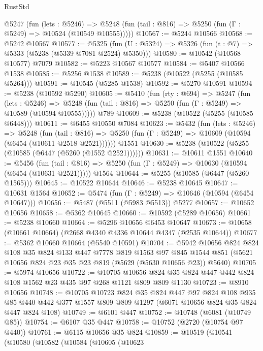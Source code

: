 \begin{lexlean}{RustStd}
\begin{coremodule}
    @5247
      (fun (lets : @5246) =>
      @5248 (fun (tail : @816) => @5250 (fun (Γ : @5249) => @10524 (@10549 @10555)))))
@10567 := @5244 @10566
@10568 := @5242 @10567
@10577 := @5325 (fun (U : @5324) => @5326 (fun (t : @7) => @5333 (@5238 (@5339 @7081 @2524) @5350)))
@10580 := @10542 (@10568 @10577) @7079
@10582 := @5223 @10567 @10577
@10584 := @5407 @10566 @1538
@10585 := @5256 @1538
@10589 := @5238 (@10522 (@5255 (@10585 @5264)))
@10591 := @10545 (@5285 @1538)
@10592 := @5270 @10591
@10594 := @5238 (@10592 @5290)
@10605 := @5410
    (fun (rty : @694) =>
    @5247
      (fun (lets : @5246) =>
      @5248 (fun (tail : @816) => @5250 (fun (Γ : @5249) => @10589 (@10594 @10555)))))
    @789
@10609 := @5238 (@10522 (@5255 (@10585 @6448)))
@10611 := @6455 @10550 @7084
@10623 := @5432
    (fun (lets : @5246) =>
    @5248
      (fun (tail : @816) =>
      @5250 (fun (Γ : @5249) => @10609 (@10594 (@6454 (@10611 @2518 @2521))))))
    @1551
@10630 := @5238 (@10522 (@5255 (@10585 (@6447 (@5260 (@1552 @2521))))))
@10631 := @10611 @1551
@10640 := @5456
    (fun (tail : @816) => @5250 (fun (Γ : @5249) => @10630 (@10594 (@6454 (@10631 @2521)))))
    @1564
@10644 := @5255 (@10585 (@6447 (@5260 @1565)))
@10645 := @10522 @10644
@10646 := @5238 @10645
@10647 := @10631 @1564
@10652 := @5474 (fun (Γ : @5249) => @10646 (@10594 (@6454 @10647)))
@10656 := @5487 (@5511 (@5983 @5513)) @5277
@10657 := @10652 @10656
@10658 := @5362 @10645
@10660 := @10592 (@5289 @10656)
@10661 := @5238 @10660
@10664 := @5296 @10656 @6453 @10647
@10673 := @10658 (@10661 @10664) (@2668 @4340 @4336 @10644 @4347 (@2535 @10644))
@10677 := @5362 @10660 @10664 (@5540 @10591)
@10704 := @5942
    @10656
    @824
    @824
    @108
    @35
    @824
    @133
    @447
    @7778
    @819
    @1563
    @97
    @845
    @1544
    @851
    (@5621 @10656 @824 @23 @35 @23 @819 (@5629 (@5630 @10656 @23)) @5640)
@10705 := @5974 @10656
@10722 := @10705
    @10656
    @824
    @35
    @824
    @447
    @442
    @824
    @108
    @1562
    @23
    @435
    @97
    @268
    @1121
    @809
    @809
    @1130
@10723 := @8910 @10656
@10748 := @10705
    @10723
    @824
    @35
    @824
    @447
    @97
    @824
    @108
    @935
    @85
    @440
    @442
    @377
    @1557
    @809
    @809
    @1297
    (@6071 @10656 @824 @35 @824 @447 @824 @108)
@10749 := @6101 @447
@10752 := @10748 (@6081 (@10749 @85))
@10754 := @6107 @35 @447
@10758 := @10752 (@2720 (@10754 @97 @440))
@10761 := @6115 @10656 @35 @824
@10859 := @10519
    (@10541
      (@10580
        (@10582
          (@10584
            (@10605
              (@10623

\end{coremodule}
\end{lexlean}
